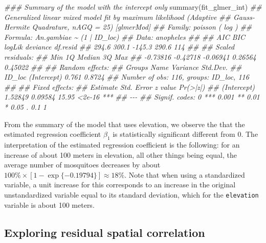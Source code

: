 \documentclass[
  letterpaper,
]{krantz}
\newenvironment{Shaded}{\begin{snugshade}}{\end{snugshade}}
\newcommand{\DocumentationTok}[1]{\textcolor[rgb]{0.37,0.37,0.37}{\textit{#1}}}
\newcommand{\FunctionTok}[1]{\textcolor[rgb]{0.28,0.35,0.67}{#1}}
\newcommand{\NormalTok}[1]{\textcolor[rgb]{0.00,0.23,0.31}{#1}}
\begin{document}
\begin{Shaded}
\begin{Highlighting}[]
\DocumentationTok{\#\#\# Summary of the model with the intercept only}
\FunctionTok{summary}\NormalTok{(fit\_glmer\_int)}
\DocumentationTok{\#\# Generalized linear mixed model fit by maximum likelihood (Adaptive}
\DocumentationTok{\#\#   Gauss{-}Hermite Quadrature, nAGQ = 25) [glmerMod]}
\DocumentationTok{\#\#  Family: poisson  ( log )}
\DocumentationTok{\#\# Formula: An.gambiae \textasciitilde{} (1 | ID\_loc)}
\DocumentationTok{\#\#    Data: anopheles}
\DocumentationTok{\#\# }
\DocumentationTok{\#\#      AIC      BIC   logLik deviance df.resid }
\DocumentationTok{\#\#    294.6    300.1   {-}145.3    290.6      114 }
\DocumentationTok{\#\# }
\DocumentationTok{\#\# Scaled residuals: }
\DocumentationTok{\#\#      Min       1Q   Median       3Q      Max }
\DocumentationTok{\#\# {-}0.73816 {-}0.42718 {-}0.06941  0.26564  0.45022 }
\DocumentationTok{\#\# }
\DocumentationTok{\#\# Random effects:}
\DocumentationTok{\#\#  Groups Name        Variance Std.Dev.}
\DocumentationTok{\#\#  ID\_loc (Intercept) 0.761    0.8724  }
\DocumentationTok{\#\# Number of obs: 116, groups:  ID\_loc, 116}
\DocumentationTok{\#\# }
\DocumentationTok{\#\# Fixed effects:}
\DocumentationTok{\#\#             Estimate Std. Error z value Pr(\textgreater{}|z|)    }
\DocumentationTok{\#\# (Intercept)  1.52849    0.09584   15.95   \textless{}2e{-}16 ***}
\DocumentationTok{\#\# {-}{-}{-}}
\DocumentationTok{\#\# Signif. codes:  0 \textquotesingle{}***\textquotesingle{} 0.001 \textquotesingle{}**\textquotesingle{} 0.01 \textquotesingle{}*\textquotesingle{} 0.05 \textquotesingle{}.\textquotesingle{} 0.1 \textquotesingle{} \textquotesingle{} 1}
\end{Highlighting}
\end{Shaded}

From the summary of the model that uses elevation, we observe the that
the estimated regression coefficient \(\beta_{1}\) is statistically
significant different from 0. The interpretation of the estimated
regression coefficient is the following: for an increase of about 100
meters in elevation, all other things being equal, the average number of
mosquitoes decreases by about
\(100\% \times [1-\exp\{-0.19794\}] \approx 18\%\). Note that when using
a standardized variable, a unit increase for this corresponds to an
increase in the original unstandardized variable equal to its standard
deviation, which for the \texttt{elevation} variable is about 100
meters.

\hypertarget{exploring-residual-spatial-correlation}{%
\subsection{Exploring residual spatial
correlation}\label{exploring-residual-spatial-correlation}}
\end{document}
